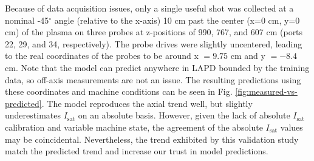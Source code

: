 Because of data acquisition issues, only a single useful shot was collected at a nominal -45$^\circ$ angle (relative to the x-axis) 10 cm past the center (x=0 cm, y=0 cm) of the plasma on three probes at z-positions of 990, 767, and 607 cm (ports 22, 29, and 34, respectively). The probe drives were slightly uncentered, leading to the real coordinates of the probes to be around x $=9.75$ cm and y $=-8.4$ cm. Note that the model can predict anywhere in LAPD bounded by the training data, so off-axis measurements are not an issue.
The resulting predictions using these coordinates and machine conditions can be seen in Fig. \ref{fig:measured-vs-predicted}. 
The model reproduces the axial trend well, but slightly underestimates $I_\text{sat}$ on an absolute basis. However, given the lack of absolute $I_\text{sat}$ calibration and variable machine state, the agreement of the absolute $I_\text{sat}$ values may be coincidental. Nevertheless, the trend exhibited by this validation study match the predicted trend and increase our trust in model predictions. 

